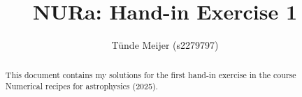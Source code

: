 \documentclass[a4paper,10pt]{article}
\title{NURa: Hand-in Exercise 1}
\author{Tünde Meijer (s2279797)}
\begin{document}
\maketitle

\begin{abstract}
 This document contains my solutions for the first hand-in exercise in the 
 course Numerical recipes for astrophysics (2025).
\end{abstract}




\end{document}
